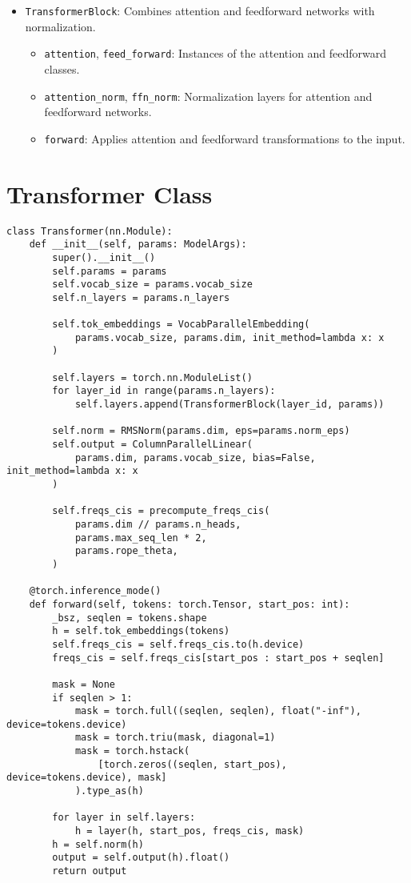 \begin{itemize}
    \item \texttt{TransformerBlock}: Combines attention and feedforward networks with normalization.
    \begin{itemize}
        \item \texttt{attention}, \texttt{feed\_forward}: Instances of the attention and feedforward classes.
        \item \texttt{attention\_norm}, \texttt{ffn\_norm}: Normalization layers for attention and feedforward networks.
        \item \texttt{forward}: Applies attention and feedforward transformations to the input.
    \end{itemize}
\end{itemize}

\section{Transformer Class}

\begin{lstlisting}
class Transformer(nn.Module):
    def __init__(self, params: ModelArgs):
        super().__init__()
        self.params = params
        self.vocab_size = params.vocab_size
        self.n_layers = params.n_layers

        self.tok_embeddings = VocabParallelEmbedding(
            params.vocab_size, params.dim, init_method=lambda x: x
        )

        self.layers = torch.nn.ModuleList()
        for layer_id in range(params.n_layers):
            self.layers.append(TransformerBlock(layer_id, params))

        self.norm = RMSNorm(params.dim, eps=params.norm_eps)
        self.output = ColumnParallelLinear(
            params.dim, params.vocab_size, bias=False, init_method=lambda x: x
        )

        self.freqs_cis = precompute_freqs_cis(
            params.dim // params.n_heads,
            params.max_seq_len * 2,
            params.rope_theta,
        )

    @torch.inference_mode()
    def forward(self, tokens: torch.Tensor, start_pos: int):
        _bsz, seqlen = tokens.shape
        h = self.tok_embeddings(tokens)
        self.freqs_cis = self.freqs_cis.to(h.device)
        freqs_cis = self.freqs_cis[start_pos : start_pos + seqlen]

        mask = None
        if seqlen > 1:
            mask = torch.full((seqlen, seqlen), float("-inf"), device=tokens.device)
            mask = torch.triu(mask, diagonal=1)
            mask = torch.hstack(
                [torch.zeros((seqlen, start_pos), device=tokens.device), mask]
            ).type_as(h)

        for layer in self.layers:
            h = layer(h, start_pos, freqs_cis, mask)
        h = self.norm(h)
        output = self.output(h).float()
        return output
\end{lstlisting}

